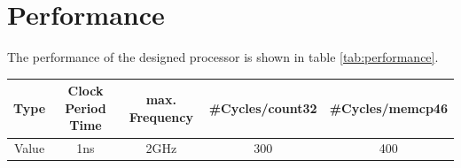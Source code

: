 \section{Performance}

The performance of the designed processor is shown in table \ref{tab:performance}.

\centering
\begin{tabular}{|c|c|c|c|c|}
\hline 
Type & Clock Period Time & max. Frequency & \#Cycles/count32 & \#Cycles/memcp46 \\ 
\hline 
Value & 1ns & 2GHz & 300 & 400 \\ 
\hline 
\end{tabular} 
\label{tab:performance}
